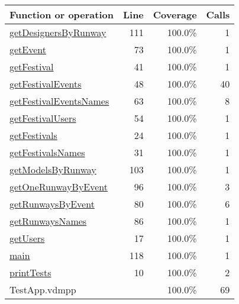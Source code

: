 \begin{longtable}{|l|r|r|r|}
\hline
Function or operation & Line & Coverage & Calls \\
\hline
\hline
\hyperref[getDesignersByRunway:111]{getDesignersByRunway} & 111&100.0\% & 1 \\
\hline
\hyperref[getEvent:73]{getEvent} & 73&100.0\% & 1 \\
\hline
\hyperref[getFestival:41]{getFestival} & 41&100.0\% & 1 \\
\hline
\hyperref[getFestivalEvents:48]{getFestivalEvents} & 48&100.0\% & 40 \\
\hline
\hyperref[getFestivalEventsNames:63]{getFestivalEventsNames} & 63&100.0\% & 8 \\
\hline
\hyperref[getFestivalUsers:54]{getFestivalUsers} & 54&100.0\% & 1 \\
\hline
\hyperref[getFestivals:24]{getFestivals} & 24&100.0\% & 1 \\
\hline
\hyperref[getFestivalsNames:31]{getFestivalsNames} & 31&100.0\% & 1 \\
\hline
\hyperref[getModelsByRunway:103]{getModelsByRunway} & 103&100.0\% & 1 \\
\hline
\hyperref[getOneRunwayByEvent:96]{getOneRunwayByEvent} & 96&100.0\% & 3 \\
\hline
\hyperref[getRunwaysByEvent:80]{getRunwaysByEvent} & 80&100.0\% & 6 \\
\hline
\hyperref[getRunwaysNames:86]{getRunwaysNames} & 86&100.0\% & 1 \\
\hline
\hyperref[getUsers:17]{getUsers} & 17&100.0\% & 1 \\
\hline
\hyperref[main:118]{main} & 118&100.0\% & 1 \\
\hline
\hyperref[printTests:10]{printTests} & 10&100.0\% & 2 \\
\hline
\hline
TestApp.vdmpp & & 100.0\% & 69 \\
\hline
\end{longtable}

